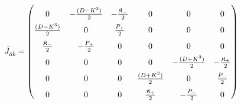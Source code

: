 \documentclass[]{article}
\numberwithin{equation}{section}
\begin{document}
{{  \begin{align}
     \bar{J}_{\bar{a}\bar{b}}&=\begin{pmatrix}
         \rule{0pt}{16pt} 0 & -\frac{(D-K^3)}{2} & -\frac{\mathfrak{K}_{-}}{2}&0&0&0\\
         \rule{0pt}{16pt} \frac{(D-K^3)}{2}&0& \frac{P_{+}}{2}&0&0&0\\
         \rule{0pt}{16pt} \frac{\mathfrak{K}_{-}}{2}&-\frac{P_{+}}{2}&0&0&0&0\\
         \rule{0pt}{16pt} 0&0&0&0 & -\frac{(D+K^3)}{2} & -\frac{\mathfrak{K}_{+}}{2}\\
         \rule{0pt}{16pt}  0&0&0 &\frac{(D+K^3)}{2}&0& \frac{P_{-}}{2}\\
          \rule{0pt}{16pt}  0&0&0 & \frac{\mathfrak{K}_{+}}{2}&-\frac{P_{-}}{2}&0
     \end{pmatrix}
 \end{align}

}}
\end{document}
